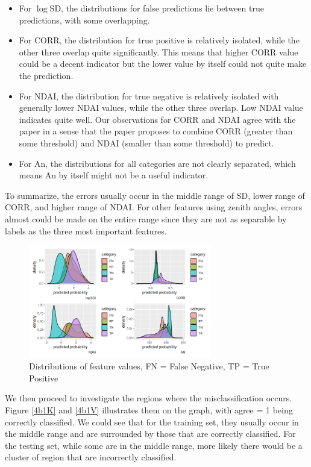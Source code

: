 \documentclass[11pt]{article}
\theoremstyle{definition}
\begin{document}
\begin{itemize}
\item For $\log$SD, the distributions for false predictions lie between true predictions, with some overlapping.

\item For CORR, the distribution for true positive is relatively isolated, while the other three overlap quite significantly. This means that higher CORR value could be a decent indicator but the lower value by itself could not quite make the prediction.

\item For NDAI, the distribution for true negative is relatively isolated with generally lower NDAI values, while the other three overlap. Low NDAI value indicates quite well. Our observations for CORR and NDAI agree with the paper in a sense that the paper proposes to combine CORR (greater than some threshold) and NDAI (smaller than some threshold) to predict.

\item For An, the distributions for all categories are not clearly separated, which means An by itself might not be a useful indicator.
\end{itemize}

To summarize, the errors usually occur in the middle range of SD, lower range of CORR, and higher range of NDAI. For other features using zenith angles, errors almost could be made on the entire range since they are not as separable by labels as the three most important features.

\begin{figure}[h]
\centering
\includegraphics[width=8cm]{figures/4b3.png}
\caption{Distributions of feature values, FN = False Negative, TP = True Positive}
\label{4b0}
\end{figure}
\FloatBarrier

We then proceed to investigate the regions where the misclassification occurs. Figure \ref{4b1K} and \ref{4b1V} illustrates them on the graph, with agree = 1 being correctly classified. We could see that for the training set, they usually occur in the middle range and are surrounded by those that are correctly classified. For the testing set, while some are in the middle range, more likely there would be a cluster of region that are incorrectly classified.
\end{document}
